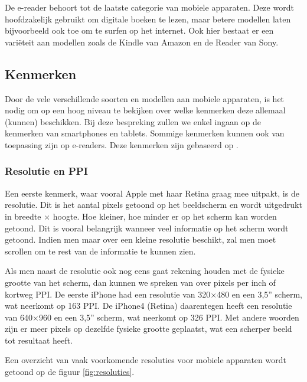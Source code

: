 De e-reader behoort tot de laatste categorie van mobiele apparaten. Deze wordt hoofdzakelijk gebruikt om digitale boeken te lezen, maar betere modellen laten bijvoorbeeld ook toe om te surfen op het internet. Ook hier bestaat er een variëteit aan modellen zoals de Kindle van Amazon en de Reader van Sony.

\subsection{Kenmerken}
Door de vele verschillende soorten en modellen aan mobiele apparaten, is het nodig om op een hoog niveau te bekijken over welke kenmerken deze allemaal (kunnen) beschikken. Bij deze bespreking zullen we enkel ingaan op de kenmerken van smartphones en tablets. Sommige kenmerken kunnen ook van toepassing zijn op e-readers. Deze kenmerken zijn gebaseerd op \cite{PhilDutson2012}.

\subsubsection{Resolutie en PPI}
Een eerste kenmerk, waar vooral Apple met haar Retina graag mee uitpakt, is de resolutie. Dit is het aantal pixels getoond op het beeldscherm en wordt uitgedrukt in breedte $\times$ hoogte. Hoe kleiner, hoe minder er op het scherm kan worden getoond. Dit is vooral belangrijk wanneer veel informatie op het scherm wordt getoond. Indien men maar over een kleine resolutie beschikt, zal men moet scrollen om te rest van de informatie te kunnen zien.

Als men naast de resolutie ook nog eens gaat rekening houden met de fysieke grootte van het scherm, dan kunnen we spreken van over pixels per inch of kortweg PPI. De eerste iPhone had een resolutie van 320$\times$480 en een 3,5” scherm, wat neerkomt op 163 PPI. De iPhone4 (Retina) daarentegen heeft een resolutie van 640$\times$960 en een 3,5” scherm, wat neerkomt op 326 PPI. Met andere woorden zijn er meer pixels op dezelfde fysieke grootte geplaatst, wat een scherper beeld tot resultaat heeft.

Een overzicht van vaak voorkomende resoluties voor mobiele apparaten wordt getoond op de figuur \ref{fig:resoluties}.


